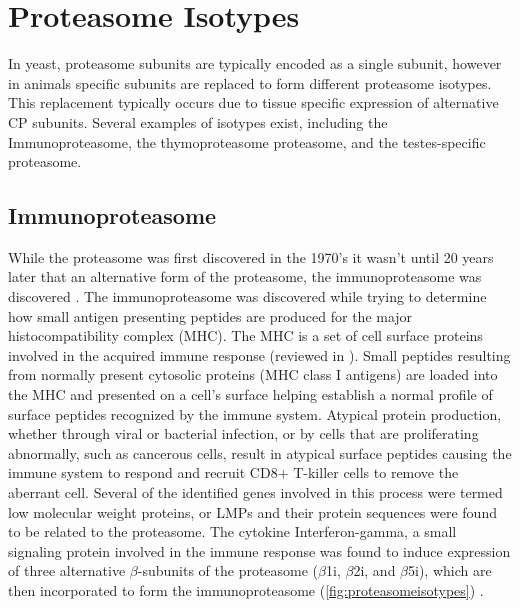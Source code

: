 \section{Proteasome Isotypes}
	In yeast, proteasome subunits are typically encoded as a single subunit, however in animals specific subunits are replaced to form different proteasome isotypes. This replacement typically occurs due to tissue specific expression of alternative CP subunits. Several examples of isotypes exist, including the Immunoproteasome, the thymoproteasome proteasome, and the testes-specific proteasome.

\subsection{Immunoproteasome}
While the proteasome was first discovered in the 1970's it wasn’t until 20 years later that an alternative form of the proteasome, the immunoproteasome was discovered \citep{brown91, glynne91, ortiz-navarrete91}. The immunoproteasome was discovered while trying to determine how small antigen presenting peptides are produced for the major histocompatibility complex (MHC). The MHC is a set of cell surface proteins involved in the acquired immune response (reviewed in \citep{neefjes11}). Small peptides resulting from normally present cytosolic proteins (MHC class I antigens) are loaded into the MHC and presented on a cell’s surface helping establish a normal profile of surface peptides recognized by the immune system. Atypical protein production, whether through viral or bacterial infection, or by cells that are proliferating abnormally, such as cancerous cells, result in atypical surface peptides causing the immune system to respond and recruit CD8+ T-killer cells to remove the aberrant cell. Several of the identified genes involved in this process were termed low molecular weight proteins, or LMPs and their protein sequences were found to be related to the proteasome. The cytokine Interferon-gamma, a small signaling protein involved in the immune response was found to induce expression of three alternative $\beta$-subunits of the proteasome ($\beta$1i, $\beta$2i, and $\beta$5i), which are then incorporated to form the immunoproteasome (\ref{fig:proteasomeisotypes}) \citep{aki94, groettrup96}.

